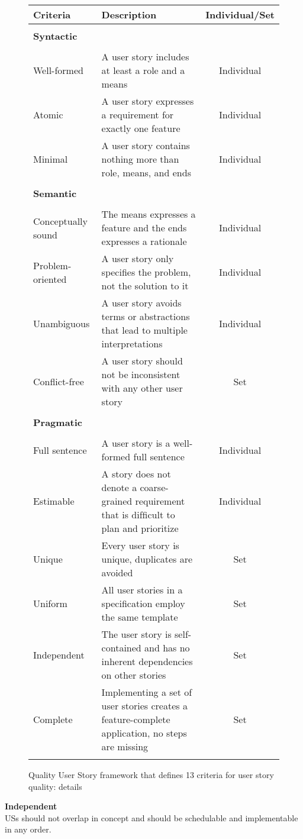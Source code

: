 \begin{figure}
\begingroup
\footnotesize

\begin{tabularx}{\textwidth}{l  X  c}
 \hline
 Criteria & Description & Individual/Set \\
\hline
\hline
\\
\textbf{Syntactic} \\
\\ 
Well-formed & A user story includes at least a role and a means & Individual \\
Atomic & A user story expresses a requirement for exactly one feature & Individual \\
Minimal & A user story contains nothing more than role, means, and ends & Individual \\
\\ 
 \textbf{Semantic} \\
 \\ 
Conceptually sound&The means expresses a feature and the ends expresses a rationale & Individual\\
Problem-oriented& A user story only speciﬁes the problem, not the solution to it& Individual\\
Unambiguous&A user story avoids terms or abstractions that lead to multiple interpretations &Individual \\
Conflict-free&A user story should not be inconsistent with any other user story &Set \\
\\ 
\textbf{Pragmatic}\\
\\ 
Full sentence&A user story is a well-formed full sentence &Individual \\
Estimable&A story does not denote a coarse-grained requirement that is difﬁcult to plan and prioritize &Individual \\
Unique&Every user story is unique, duplicates are avoided &Set \\
Uniform&All user stories in a speciﬁcation employ the same template &Set \\
Independent&The user story is self-contained and has no inherent dependencies on other stories &Set \\
Complete&Implementing a set of user stories creates a feature-complete application, no steps are missing &Set \\
 \\
 \hline

\end{tabularx}
\begin{TableCaption}
\caption{Quality User Story framework that deﬁnes 13 criteria for user story quality: details \cite{lucassen2016improving}}\label{tb:qus}
\end{TableCaption}
\endgroup
\end{figure}
\textbf{Independent}\\ 
USs should not overlap in concept and should be schedulable and implementable in any order. 

